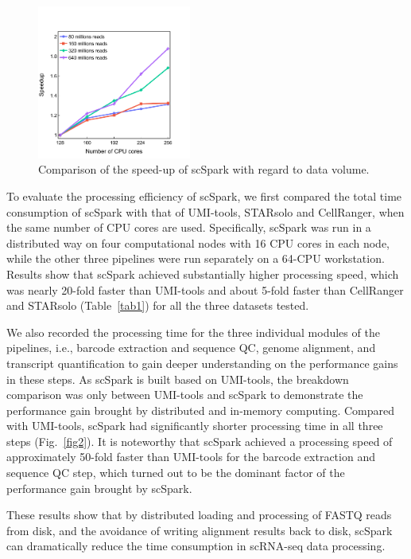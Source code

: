 \documentclass[conference]{IEEEtran}
\begin{document}
\begin{figure}
	\centering
	\includegraphics[width=0.45\textwidth]{fig5.pdf}
	\caption{Comparison of the speed-up of scSpark with regard to data volume.} \label{fig5}
\end{figure}

To evaluate the processing efficiency of scSpark, we first compared the total time consumption of scSpark with that of UMI-tools, STARsolo and CellRanger, when the same number of CPU cores are used. Specifically, scSpark was run in a distributed way on four computational nodes with 16 CPU cores in each node, while the other three pipelines were run separately on a 64-CPU workstation. 
Results show that scSpark achieved substantially higher processing speed, which was nearly 20-fold faster than UMI-tools and about 5-fold faster than CellRanger and STARsolo (Table~\ref{tab1}) for all the three datasets tested.  

We also recorded the processing time for the three individual modules of the pipelines, i.e., barcode extraction and sequence QC, genome alignment, and transcript quantification to gain deeper understanding on the performance gains in these steps. 
As scSpark is built based on UMI-tools, the breakdown comparison was only between UMI-tools and scSpark to demonstrate the performance gain brought by distributed and in-memory computing. 
Compared with UMI-tools, scSpark had significantly shorter processing time in all three steps (Fig.~\ref{fig2}).
It is noteworthy that scSpark achieved a processing speed of approximately 50-fold faster than UMI-tools for the barcode extraction and sequence QC step, which turned out to be the dominant factor of the performance gain brought by scSpark. 

These results show that by distributed loading and processing of FASTQ reads from disk, and the avoidance of writing alignment results back to disk, scSpark can dramatically reduce the time consumption in scRNA-seq data processing. 
\end{document}
